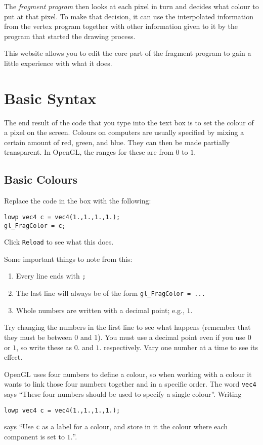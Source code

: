 \documentclass[
  html5,%
  mathml,%
  use filename%
]{internet}
\makeatletter
\let\prev@sec=\section
\renewcommand\section{\clearpage\prev@sec}
\makeatother
\begin{document}
The \emph{fragment program} then looks at each pixel in turn and decides what colour to put at that pixel.
To make that decision, it can use the interpolated information from the vertex program together with other information given to it by the program that started the drawing process.

This website allows you to edit the core part of the fragment program to gain a little experience with what it does. 

\section{Basic Syntax}

The end result of the code that you type into the text box is to set the colour of a pixel on the screen.
Colours on computers are usually specified by mixing a certain amount of red, green, and blue.
They can then be made partially transparent.
In OpenGL, the ranges for these are from \(0\) to \(1\).

\subsection{Basic Colours}

Replace the code in the box with the following:

\begin{tcolorbox}
\begin{verbatim}
lowp vec4 c = vec4(1.,1.,1.,1.);
gl_FragColor = c;
\end{verbatim}
\end{tcolorbox}

Click \texttt{Reload} to see what this does.

Some important things to note from this:
%
\begin{enumerate}
\item Every line ends with \verb+;+
\item The last line will always be of the form \verb+gl_FragColor = ...+
\item Whole numbers are written with a decimal point; e.g., \(1.\)
\end{enumerate}

Try changing the numbers in the first line to see what happens (remember that they must be between \(0\) and \(1\)).
You must use a decimal point even if you use \(0\) or \(1\), so write these as \(0.\) and \(1.\) respectively.
Vary one number at a time to see its effect.

\begin{tcolorbox}
OpenGL uses four numbers to define a colour, so when working with a colour it wants to link those four numbers together and in a specific order.
The word \verb+vec4+ says ``These four numbers should be used to specify a single colour''.
Writing
%
\begin{verbatim}
lowp vec4 c = vec4(1.,1.,1.,1.);
\end{verbatim}
%
says ``Use \verb+c+ as a label for a colour, and store in it the colour where each component is set to \(1.\)''.
\end{tcolorbox}
\end{document}

